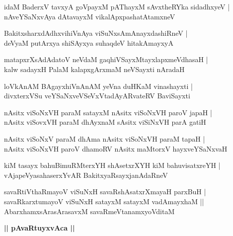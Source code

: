 \documentclass[twoside,12pt,openright]{book}
\newcounter{shloka}[chapter]
\def\uvaca#1{\centerline{{\large\textbf{#1}}}}
\begin{document}
\begin{shloka}%
idaM BaderxV tavxyA goVpayxM pAThayxM sAvxtheRYka sidadhxyeV |\\
nAveYSaNxvAya dAtavayxM vikalApxpashatAtamxneV 
\end{shloka}

\begin{shloka}%
BakitxsharxdAdhxvihiVnAya viSuNxsAmAnayxdashiRneV |\\
deVyaM putArxya shiSAyxya suhaqdeV hitakAmayxyA 
\end{shloka}

\begin{shloka}%
matapxrXsAdAdatoV neVdaM gaqhiVSayxMtayxlapxmeVdhasaH |\\
kalw sadayxH PalaM kalapxgArxmaM neVSayxti nAradaH 
\end{shloka}

\begin{shloka}%
loVkAnAM BAgayxhiVnAnAM yeVna duHKaM vinashayxti |\\
divxterxVSu veYSaNxveVSeVxVtadAyARvateRV BaviSayxti
\end{shloka}

\begin{shloka}%
nAsitx viSoNxVH paraM satayxM nAsitx viSoNxVH paroV japaH |\\
nAsitx viSovxVH paraM dhAyxnaM sAsitx viSiNxVH parA gatiH 
\end{shloka}

\begin{shloka}%
nAsitx viSoNxV paraM dhAma nAsitx viSoNxVH paraM tapaH |\\
nAsitx viSoNxVH paroV dhamoRV nAsitx maMtorxV hayxveYSaNxvaH 
\end{shloka}

\begin{shloka}%
kiM tasayx bahuBimuRMterxYH shAsetxrXYH kiM bahuvisatxreYH |\\
vAjapeVyasahaserxYvAR BakitxyaRsayxjanAdaRneV 
\end{shloka}

\begin{shloka}%
savaRtiVthaRmayoV viSuNxH savaRshAsatxrXmayaH parxBuH |\\
savaRkarxtumayoV viSuNxH satayxM satayxM vadAmayxhaM ||\\
AbarxhamxsArasArasavxM savaRmeVtanamxyoVditaM 
\end{shloka}

\uvaca{|| pAvaRtuyxvAca ||}
\end{document}
